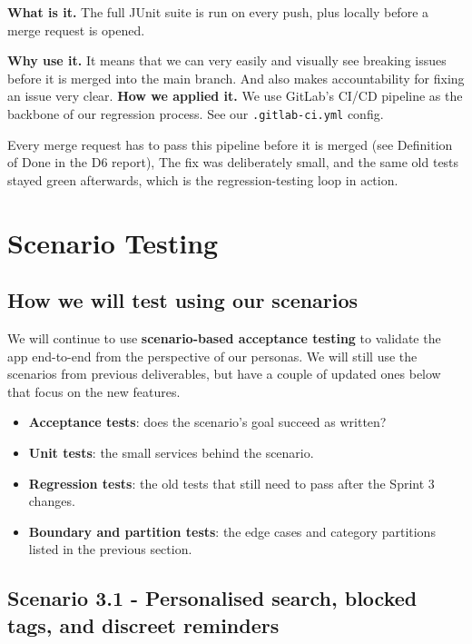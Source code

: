 \documentclass[a4paper, 12pt]{article}
\begin{document}
    \textbf{What is it.} The full JUnit suite is run on every push, plus locally
    before a merge request is opened.

    \textbf{Why use it.} It means that we can very easily and visually see
    breaking issues before it is merged into the main branch. And also makes accountability
    for fixing an issue very clear. \textbf{How we applied it.} We use GitLab's CI/CD
    pipeline as the backbone of our regression process. See our \texttt{.gitlab-ci.yml}
    config.

    Every merge request has to pass this pipeline before it is merged (see
    Definition of Done in the D6 report), The fix was deliberately small, and the
    same old tests stayed green afterwards, which is the regression-testing loop
    in action.

    \section{Scenario Testing}

    \subsection{How we will test using our scenarios}

    We will continue to use \textbf{scenario-based acceptance testing} to validate
    the app end-to-end from the perspective of our personas. We will still use
    the scenarios from previous deliverables, but have a couple of updated ones below
    that focus on the new features.

    \begin{itemize}
        \item \textbf{Acceptance tests}: does the scenario's goal succeed as written?

        \item \textbf{Unit tests}: the small services behind the scenario.

        \item \textbf{Regression tests}: the old tests that still need to pass after
            the Sprint 3 changes.

        \item \textbf{Boundary and partition tests}: the edge cases and category
            partitions listed in the previous section.
    \end{itemize}

    \subsection{Scenario 3.1 - Personalised search, blocked tags, and discreet
    reminders}
\end{document}
